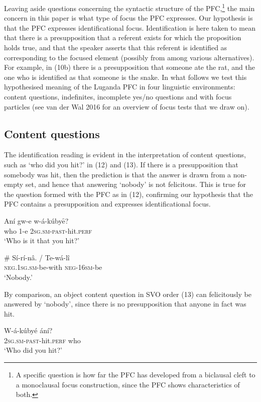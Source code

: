 \documentclass[output=paper]{langsci/langscibook}
\begin{document}
Leaving aside questions concerning the syntactic structure of the PFC,\footnote{A specific question is how far the PFC has developed from a biclausal cleft to a monoclausal focus construction, since the PFC shows characteristics of both.}{} the main concern in this paper is what type of focus the PFC expresses. Our hypothesis is that the PFC expresses identificational focus. Identification is here taken to mean that there is a presupposition that a referent exists for which the proposition holds true, and that the speaker asserts that this referent is identified as corresponding to the focused element (possibly from among various alternatives). For example, in (10b) there is a presupposition that someone ate the rat, and the one who is identified as that someone is the snake. In what follows we test this hypothesised meaning of the Luganda PFC in four linguistic environments: content questions, indefinites, incomplete yes/no questions and with focus particles (see van der Wal 2016 for an overview of focus tests that we draw on).

\subsection{Content questions} %

The identification reading is evident in the interpretation of content questions, such as ‘who did you hit?’ in (12) and (13). If there is a presupposition that somebody was hit, then the prediction is that the answer is drawn from a non-empty set, and hence that answering ‘nobody’ is not felicitous. This is true for the question formed with the PFC as in (12), confirming our hypothesis that the PFC contains a presupposition and expresses identificational focus. 

\ea
\gll Aní  gw-e  w-á-kúbyȇ?\\
     who  1-e  \textsc{2sg.sm-past}-hit.\textsc{perf}\\
\glt ‘Who is it that you hit?’
\z

\ea
\gll \# Sí-rí-nâ.    /  Te-wá-lî\\
     \textsc{neg.1sg.sm}-be-with    \textsc{neg-16sm}-be\\
\glt ‘Nobody.’
\z

By comparison, an object content question in SVO order (13) can felicitously be answered by ‘nobody’, since there is no presupposition that anyone in fact was hit.

\ea
\gll W-á-kúbyé    ání?\\
     \textsc{2sg.sm-past}-hit.\textsc{perf}  who\\
\glt ‘Who did you hit?’
\z
\end{document}
